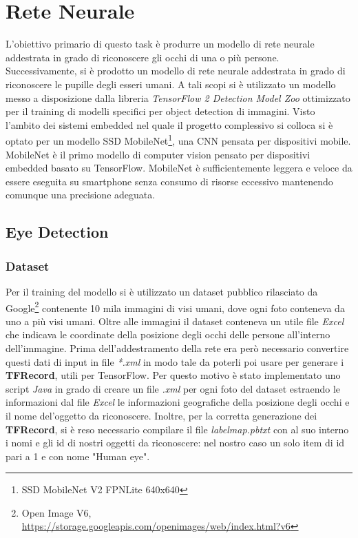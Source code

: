 \documentclass[11pt]{article}
\begin{document}
\newpage

\section{Rete Neurale}
L’obiettivo primario di questo task è produrre un modello di rete neurale addestrata in grado di riconoscere gli occhi di una o più persone. Successivamente, si è prodotto un modello di rete neurale addestrata in grado di riconoscere le pupille degli esseri umani.
\newline
A tali scopi si è utilizzato un modello messo a disposizione dalla libreria \textit{TensorFlow 2 Detection Model Zoo} ottimizzato per il training di modelli specifici per object detection di immagini. Visto l’ambito dei sistemi embedded nel quale il progetto complessivo si colloca si è optato per un modello SSD MobileNet\footnote{SSD MobileNet V2 FPNLite 640x640}, una CNN pensata per dispositivi mobile. MobileNet è il primo modello di computer vision pensato per dispositivi embedded basato su TensorFlow. MobileNet è sufficientemente leggera e veloce da essere eseguita su smartphone senza consumo di risorse eccessivo mantenendo comunque una precisione adeguata.

\newpage

\subsection{Eye Detection}
\subsubsection{Dataset}
Per il training del modello si è utilizzato un dataset pubblico rilasciato da Google\footnote{Open Image V6, \url{https://storage.googleapis.com/openimages/web/index.html?v6}} contenente 10 mila immagini di visi umani, dove ogni foto conteneva da uno a più visi umani.
\newline
Oltre alle immagini il dataset conteneva un utile file \textit{Excel} che indicava le coordinate della posizione degli occhi delle persone all'interno dell'immagine.
\newline \newline
Prima dell'addestramento della rete era però necessario convertire questi dati di input in file \textit{*.xml} in modo tale da poterli poi usare per generare i \textbf{TFRecord}, utili per TensorFlow. Per questo motivo è stato implementato uno script \textit{Java} in grado di creare un file \textit{.xml} per ogni foto del dataset estraendo le informazioni dal file \textit{Excel} le informazioni geografiche della posizione degli occhi e il nome del'oggetto da riconoscere. 
Inoltre, per la corretta generazione dei \textbf{TFRecord}, si è reso necessario compilare il file \textit{labelmap.pbtxt} con al suo interno i nomi e gli id di nostri oggetti da riconoscere: nel nostro caso un solo item di id pari a 1 e con nome "Human eye".
\end{document}
